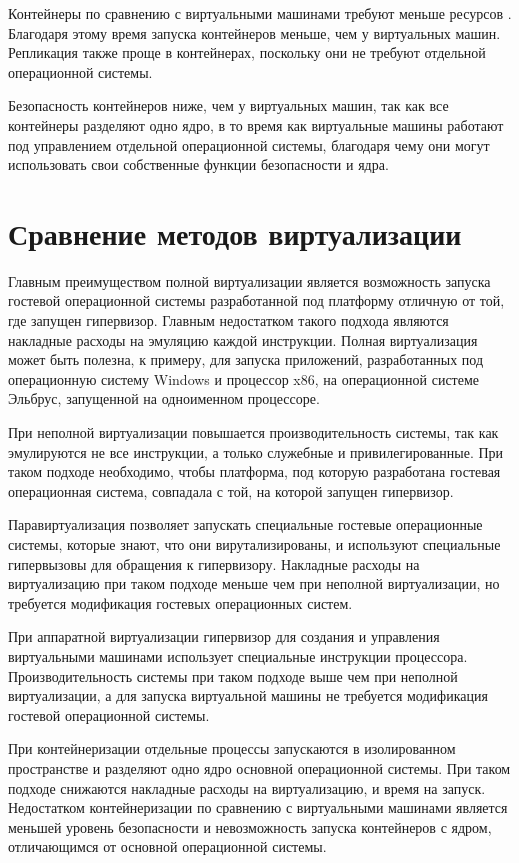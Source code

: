 Контейнеры по сравнению с виртуальными машинами требуют меньше ресурсов \cite{yadav2019docker}. Благодаря этому время запуска контейнеров меньше, чем у виртуальных машин. Репликация также проще в контейнерах, поскольку они не требуют отдельной операционной системы.

Безопасность контейнеров ниже, чем у виртуальных машин, так как все контейнеры разделяют одно ядро, в то время как виртуальные машины работают под управлением отдельной операционной системы, благодаря чему они могут использовать свои собственные функции безопасности и ядра.

\section{Сравнение методов виртуализации}
Главным преимуществом полной виртуализации является возможность запуска гостевой операционной системы разработанной под платформу отличную от той, где запущен гипервизор.
Главным недостатком такого подхода являются накладные расходы на эмуляцию каждой инструкции.
Полная виртуализация может быть полезна, к примеру, для запуска приложений, разработанных под операционную систему Windows и процессор x86, на операционной системе Эльбрус, запущенной на одноименном процессоре.

При неполной виртуализации повышается производительность системы, так как эмулируются не все инструкции, а только служебные и привилегированные.
При таком подходе необходимо, чтобы платформа, под которую разработана гостевая операционная система, совпадала с той, на которой запущен гипервизор.

Паравиртуализация позволяет запускать специальные гостевые операционные системы, которые знают, что они вирутализированы, и используют специальные гипервызовы для обращения к гипервизору.
Накладные расходы на виртуализацию при таком подходе меньше чем при неполной виртуализации, но требуется модификация гостевых операционных систем.

При аппаратной виртуализации гипервизор для создания и управления виртуальными машинами использует специальные инструкции процессора.
Производительность системы при таком подходе выше чем при неполной виртуализации, а для запуска виртуальной машины не требуется модификация гостевой операционной системы.

При контейнеризации отдельные процессы запускаются в изолированном пространстве и разделяют одно ядро основной операционной системы.
При таком подходе снижаются накладные расходы на виртуализацию, и время на запуск.
Недостатком контейнеризации по сравнению с виртуальными машинами является меньшей уровень безопасности и невозможность запуска контейнеров с ядром, отличающимся от основной операционной системы.

